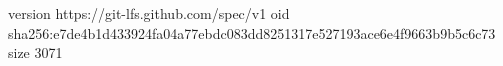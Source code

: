version https://git-lfs.github.com/spec/v1
oid sha256:e7de4b1d433924fa04a77ebdc083dd8251317e527193ace6e4f9663b9b5c6c73
size 3071
